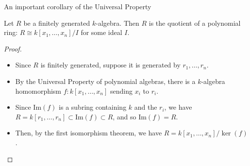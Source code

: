 \documentclass{beamer}
\begin{document}
\begin{frame}{An important corollary of the Universal Property}

\begin{lemma} Let $R$ be a finitely generated $k$-algebra.  Then $R$ is the quotient of a polynomial ring: $R\cong k[x_1,\dots, x_n]/I$ for some ideal $I$.
\end{lemma}

\begin{proof} 
\begin{itemize}[<+->]

\item Since $R$ is finitely generated, suppose it is generated by $r_1,\dots, r_n$.  

\item By the Universal Property of polynomial algebras, there is a $k$-algebra homomorphism $f:k[x_1,\dots, x_n]$ sending $x_i$ to $r_i$.  

\item Since $\textrm{Im}(f)$ is a subring containing $k$ and the $r_i$, we have $R=k[r_1,\dots, r_n]\subset \textrm{Im}(f)\subset R$, and so $\textrm{Im}(f)=R$.

\item Then, by the first isomorphism theorem, we have $R=k[x_1,\dots, x_n]/\ker(f)$.
\end{itemize}



\end{proof}


\end{frame}
\end{document}
